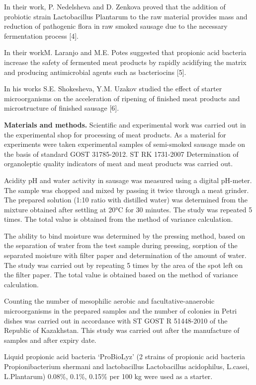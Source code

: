In their work, P. Nedelsheva and D. Zenkova proved that the addition of
probiotic strain Lactobacillus Plantarum to the raw material provides
mass and reduction of pathogenic flora in raw smoked sausage due to the
necessary fermentation process {[}4{]}.

In their workM. Laranjo and M.E. Potes suggested that propionic acid
bacteria increase the safety of fermented meat products by rapidly
acidifying the matrix and producing antimicrobial agents such as
bacteriocins {[}5{]}.

In his works S.E. Shokesheva, Y.M. Uzakov studied the effect of starter
microorganisms on the acceleration of ripening of finished meat products
and microstructure of finished sausage {[}6{]}.

{\bfseries Materials and methods.} Scientific and experimental work was
carried out in the experimental shop for processing of meat products. As
a material for experiments were taken experimental samples of
semi-smoked sausage made on the basis of standard GOST 31785-2012. ST RK
1731-2007 Determination of organoleptic quality indicators of meat and
meat products was carried out.

Acidity pH and water activity in sausage was measured using a digital
pH-meter. The sample was chopped and mixed by passing it twice through a
meat grinder. The prepared solution (1:10 ratio with distilled water)
was determined from the mixture obtained after settling at 20°C for 30
minutes. The study was repeated 5 times. The total value is obtained
from the method of variance calculation.

The ability to bind moisture was determined by the pressing method,
based on the separation of water from the test sample during pressing,
sorption of the separated moisture with filter paper and determination
of the amount of water. The study was carried out by repeating 5 times
by the area of the spot left on the filter paper. The total value is
obtained based on the method of variance calculation.

Counting the number of mesophilic aerobic and facultative-anaerobic
microorganisms in the prepared samples and the number of colonies in
Petri dishes was carried out in accordance with ST GOST R 51448-2010 of
the Republic of Kazakhstan. This study was carried out after the
manufacture of samples and after expiry date.

Liquid propionic acid bacteria `ProBioLyz' (2 strains of propionic acid
bacteria Propionibacterium shermani and lactobacillus Lactobacillus
acidophilus, L.casei, L.Plantarum) 0.08\%, 0.1\%, 0.15\% per 100 kg were
used as a starter.

